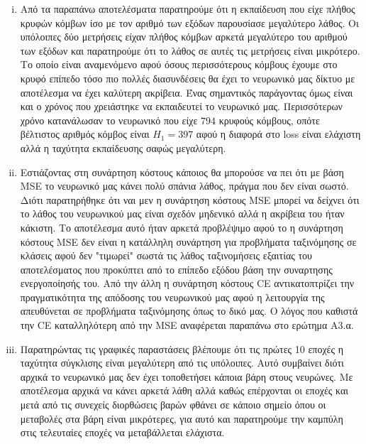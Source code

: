 \documentclass[12pt,a4paper]{article}
\newcommand{\tl}{\textlatin}
\begin{document}
\begin{enumerate}[a]
            \begin{enumerate}[i)]
                \item  Από τα παραπάνω αποτελέσματα παρατηρούμε ότι η εκπαίδευση που είχε πλήθος κρυφών κόμβων ίσο με τον αριθμό των εξόδων παρουσίασε μεγαλύτερο λάθος. Οι υπόλοιπες δύο μετρήσεις είχαν πλήθος κόμβων αρκετά μεγαλύτερο του αριθμού των εξόδων και παρατηρούμε ότι το λάθος σε αυτές τις μετρήσεις είναι μικρότερο. Το οποίο είναι αναμενόμενο αφού όσους περισσότερους κόμβους έχουμε στο κρυφό επίπεδο τόσο πιο πολλές διασυνδέσεις θα έχει το νευρωνικό μας δίκτυο με αποτέλεσμα να έχει καλύτερη ακρίβεια. Ένας σημαντικός παράγοντας όμως είναι και ο χρόνος που χρειάστηκε να εκπαιδευτεί το νευρωνικό μας. Περισσότερων χρόνο κατανάλωσαν το νευρωνικό που είχε $794$ κρυφούς κόμβους, οπότε βέλτιστος αριθμός κόμβος είναι $H_1 = 397$ αφού η διαφορά στο \tl{loss} είναι ελάχιστη αλλά η ταχύτητα εκπαίδευσης σαφώς μεγαλύτερη.
                \item Εστιάζοντας στη συνάρτηση κόστους κάποιος θα μπορούσε να πει ότι με βάση \tl{MSE} το νευρωνικό μας κάνει πολύ σπάνια λάθος, πράγμα που δεν είναι σωστό. Διότι παρατηρήθηκε ότι ναι μεν η συνάρτηση κόστους \tl{MSE}  μπορεί να δείχνει ότι το λάθος του νευρωνικού μας είναι σχεδόν μηδενικό αλλά η ακρίβεια του ήταν κάκιστη. Το αποτέλεσμα αυτό ήταν αρκετά προβλέψιμο αφού το η συνάρτηση κόστους \tl{MSE}  δεν είναι η κατάλληλη συνάρτηση για προβλήματα ταξινόμησης σε κλάσεις αφού δεν "τιμωρεί" σωστά τις λάθος ταξινομήσεις εξαιτίας του αποτελέσματος που προκύπτει από το επίπεδο εξόδου βάση την συναρτησης ενεργοποίησής του. Από την άλλη η συνάρτηση κόστους \tl{CE} αντικατοπτρίζει την πραγματικότητα της απόδοσης του νευρωνικού μας αφού η λειτουργία της απευθύνεται σε προβλήματα ταξινόμησης όπως το δικό μας. Ο λόγος που καθιστά την \tl{CE} καταλληλότερη από την \tl{MSE} αναφέρεται παραπάνω στο ερώτημα Α3.α.
                \item Παρατηρώντας τις γραφικές παραστάσεις βλέπουμε ότι τις πρώτες 10 εποχές η ταχύτητα σύγκλισης είναι μεγαλύτερη από τις υπόλοιπες. Αυτό συμβαίνει διότι αρχικά το νευρωνικό μας δεν έχει τοποθετήσει κάποια βάρη στους νευρώνες. Με αποτέλεσμα αρχικά να κάνει αρκετά λάθη αλλά καθώς επέρχονται οι εποχές και μετά από τις συνεχείς διορθώσεις βαρών φθάνει σε κάποιο σημείο όπου οι μεταβολές στα βάρη είναι μικρότερες, για αυτό και παρατηρούμε την καμπύλη στις τελευταίες εποχές να μεταβάλλεται ελάχιστα.
            \end{enumerate}


\end{enumerate}
\end{document}
